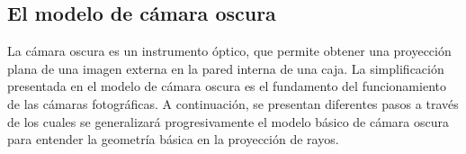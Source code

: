 % 
% 
\subsection{El modelo de cámara oscura}
La cámara oscura es un instrumento óptico, que permite obtener una proyección plana de una imagen externa en la pared interna de una caja. La simplificación presentada en el modelo de cámara oscura es el fundamento del funcionamiento de las cámaras fotográficas. A continuación, se presentan diferentes pasos a través de los cuales se generalizará progresivamente el modelo básico de cámara oscura para entender la geometría básica en la proyección de rayos.

